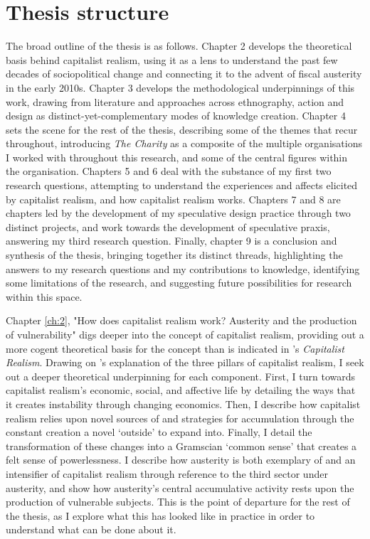 \section{Thesis structure}
The broad outline of the thesis is as follows. Chapter 2 develops the theoretical basis behind capitalist realism, using it as a lens to understand the past few decades of sociopolitical change and connecting it to the advent of fiscal austerity in the early 2010s. Chapter 3 develops the methodological underpinnings of this work, drawing from literature and approaches across ethnography, action and design as distinct-yet-complementary modes of knowledge creation. Chapter 4 sets the scene for the rest of the thesis, describing some of the themes that recur throughout, introducing \textit{The Charity} as a composite of the multiple organisations I worked with throughout this research, and some of the central figures within the organisation. Chapters 5 and 6 deal with the substance of my first two research questions, attempting to understand the experiences and affects elicited by capitalist realism, and how capitalist realism works. Chapters 7 and 8 are chapters led by the development of my speculative design practice through two distinct projects, and work towards the development of speculative praxis, answering my third research question. Finally, chapter 9 is a conclusion and synthesis of the thesis, bringing together its distinct threads, highlighting the answers to my research questions and my contributions to knowledge, identifying some limitations of the research, and suggesting future possibilities for research within this space.

Chapter \ref{ch:2}, "How does capitalist realism work? Austerity and the production of vulnerability" digs deeper into the concept of capitalist realism, providing out a more cogent theoretical basis for the concept than is indicated in \citet{fisher_capitalist_2009}'s \textit{Capitalist Realism}. Drawing on \cite{shonkwiler_reading_2014}'s explanation of the three pillars of capitalist realism, I seek out a deeper theoretical underpinning for each component. First, I turn towards capitalist realism's economic, social, and affective life by detailing the ways that it creates instability through changing economics. Then, I describe how capitalist realism relies upon novel sources of and strategies for accumulation through the constant creation a novel `outside' to expand into. Finally, I detail the transformation of these changes into a Gramscian `common sense' that creates a felt sense of powerlessness. I describe how austerity is both exemplary of and an intensifier of capitalist realism through reference to the third sector under austerity, and show how austerity's central accumulative activity rests upon the production of vulnerable subjects. This is the point of departure for the rest of the thesis, as I explore what this has looked like in practice in order to understand what can be done about it. 


